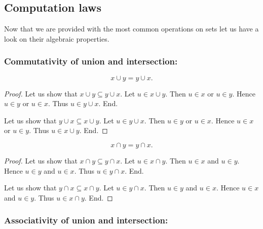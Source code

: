 \documentclass[../../set-theory.ftl.tex]{subfiles}
\begin{document}
  \subsection{Computation laws}

  \noindent Now that we are provided with the most common operations on sets
  let us have a look on their algebraic properties.

  \subsubsection*{Commutativity of union and intersection:}

  \begin{forthel}
    \begin{proposition}\label{SetTheory_01_01_830899}
      \[ x \cup y = y \cup x. \]
    \end{proposition}
    \begin{proof}
      Let us show that $x \cup y \subseteq y \cup x$.
        Let $u \in x \cup y$.
        Then $u \in x$ or $u \in y$.
        Hence $u \in y$ or $u \in x$.
        Thus $u \in y \cup x$.
      End.

      Let us show that $y \cup x \subseteq x \cup y$.
        Let $u \in y \cup x$.
        Then $u \in y$ or $u \in x$.
        Hence $u \in x$ or $u \in y$.
        Thus $u \in x \cup y$.
      End.
    \end{proof}

    \begin{proposition}\label{SetTheory_01_01_728823}
      \[ x \cap y = y \cap x. \]
    \end{proposition}
    \begin{proof}
      Let us show that $x \cap y \subseteq y \cap x$.
        Let $u \in x \cap y$.
        Then $u \in x$ and $u \in y$.
        Hence $u \in y$ and $u \in x$.
        Thus $u \in y \cap x$.
      End.

      Let us show that $y \cap x \subseteq x \cap y$.
        Let $u \in y \cap x$.
        Then $u \in y$ and $u \in x$.
        Hence $u \in x$ and $u \in y$.
        Thus $u \in x \cap y$.
      End.
    \end{proof}
  \end{forthel}


  \subsubsection*{Associativity of union and intersection:}
\end{document}
